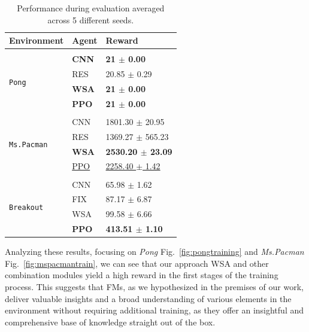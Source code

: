 \begin{table}[ht]
\centering
    \begin{tabular}[b]{lll}
                \multicolumn{1}{l}{Environment}  &\multicolumn{1}{l}{\bf Agent} &\multicolumn{1}{l}{\bf Reward} \\
                \hline \\
                \multirow{4}{*}{\texttt{Pong}} & \textbf{CNN} & \textbf{21 $\pm$ 0.00} \\
                                      & RES & 20.85 $\pm$ 0.29 \\
                                      & \textbf{WSA} & \textbf{21 $\pm$ 0.00} \\
                                      & \textbf{PPO} & \textbf{21 $\pm$ 0.00}\\

                                      \hline \\
                \multirow{4}{*}{\texttt{Ms.Pacman}} & CNN & 1801.30 $\pm$ 20.95 \\
                                      & RES & 1369.27 $\pm$ 565.23 \\
                                      &\textbf{WSA} & \textbf{2530.20 $\pm$ 23.09} \\
                                      & \underline{PPO} & \underline{2258.40 $\pm$ 1.42}\\
                                      \hline \\

                \multirow{4}{*}{\texttt{Breakout}}
                                      & CNN & 65.98 $\pm$ 1.62 \\
                                      & FIX & 87.17 $\pm$ 6.87 \\
                                      & WSA & 99.58 $\pm$ 6.66 \\
                                      & \textbf{PPO} & \textbf{413.51 $\pm$ 1.10}\\
    \end{tabular}
    \caption{Performance during evaluation averaged across 5 different seeds.}
    \label{tab:results}
\end{table}


Analyzing these results, focusing on \textit{Pong} Fig.~\ref{fig:pongtraining} and \textit{Ms.Pacman} Fig.~\ref{fig:mspacmantrain},
we can see that our approach WSA and other combination modules yield a high reward in the first stages of the training process.
This suggests that FMs, as we hypothesized in the premises of our work, deliver valuable insights and a broad understanding of various elements in the environment without requiring additional training, as they offer an insightful and comprehensive base of knowledge straight out of the box.

